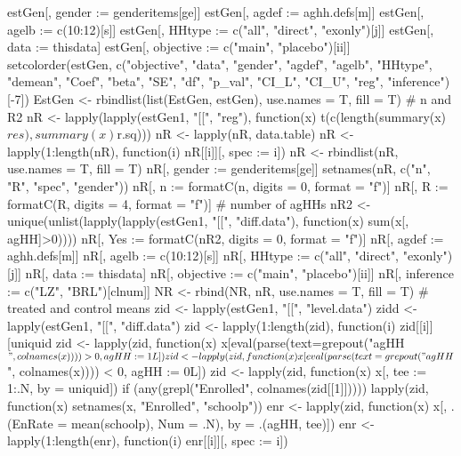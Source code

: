 \begin{Schunk}
\begin{Sinput}
{{{{{{{              estGen[, gender := genderitems[ge]]
              estGen[, agdef := aghh.defs[m]]
              estGen[, agelb := c(10:12)[s]]
              estGen[, HHtype := c("all", "direct", "exonly")[j]]
              estGen[, data := thisdata]
              estGen[, objective := c("main", "placebo")[ii]]
              setcolorder(estGen,  c("objective", "data", "gender", "agdef", "agelb", "HHtype", 
                "demean", "Coef", "beta", "SE", "df", "p_val", "CI_L", "CI_U", "reg", "inference")[-7])
              EstGen <- rbindlist(list(EstGen, estGen), use.names = T, fill = T)
              # n and R2
              nR <- lapply(lapply(estGen1, "[[", "reg"), 
                function(x) t(c(length(summary(x)$res), summary(x)$r.sq)))
              nR <- lapply(nR, data.table)
              nR <- lapply(1:length(nR), function(i) nR[[i]][, spec := i])
              nR <- rbindlist(nR, use.names = T, fill = T)
              nR[, gender := genderitems[ge]]
              setnames(nR, c("n", "R", "spec", "gender"))
              nR[, n := formatC(n, digits = 0, format = "f")]
              nR[, R := formatC(R, digits = 4, format = "f")]
              # number of agHHs
              nR2 <- unique(unlist(lapply(lapply(estGen1, "[[", "diff.data"), 
                function(x) sum(x[, agHH]>0))))
              nR[, Yes := formatC(nR2, digits = 0, format = "f")]
              nR[, agdef := aghh.defs[m]]
              nR[, agelb := c(10:12)[s]]
              nR[, HHtype := c("all", "direct", "exonly")[j]]
              nR[, data := thisdata]
              nR[, objective := c("main", "placebo")[ii]]
              nR[, inference := c("LZ", "BRL")[clnum]]
              NR <- rbind(NR, nR, use.names = T, fill = T)
              # treated and control means
              zid <- lapply(estGen1, "[[", "level.data")
              zidd <- lapply(estGen1, "[[", "diff.data")
              zid <- lapply(1:length(zid), function(i) zid[[i]][uniquid %in% zidd[[i]][, uniquid], ])
              zid <- lapply(zid, function(x) x[eval(parse(text=grepout("agHH$", colnames(x)))) > 0, 
                        agHH := 1L])
              zid <- lapply(zid, function(x) x[eval(parse(text=grepout("agHH$", colnames(x)))) < 0, 
                        agHH := 0L])
              zid <- lapply(zid, function(x) x[, tee := 1:.N, by = uniquid])
              if (any(grepl("Enrolled", colnames(zid[[1]]))))
                lapply(zid, function(x) setnames(x, "Enrolled", "schoolp"))
              enr <- lapply(zid, function(x) x[, .(EnRate = mean(schoolp), Num = .N), by = .(agHH, tee)])
              enr <- lapply(1:length(enr), function(i) enr[[i]][, spec := i])
}}}}}}}
\end{Sinput}
\end{Schunk}
